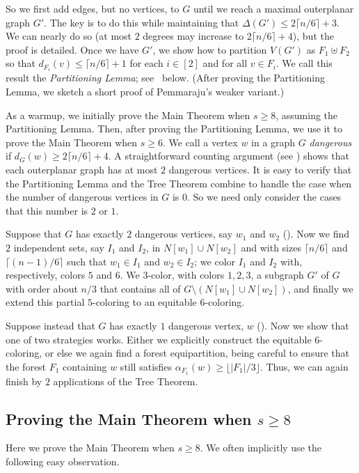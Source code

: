 \documentclass[11pt]{article}
\theoremstyle{definition}
\newcommand\floor[1]{\lfloor#1\rfloor}
\newcommand\ceil[1]{\lceil#1\rceil}
\renewcommand\ge\geqslant
\renewcommand\le\leqslant
\begin{document}
So we first add edges, but no vertices, to $G$ until we reach a maximal outerplanar graph $G'$.  The key is to do this 
while maintaining that $\Delta(G')\le 2\ceil{n/6}+3$.  We can nearly do so (at most $2$ degrees may increase to $2\ceil{n/6}+4$), but the proof is 
detailed.  Once we have $G'$, we show how to partition $V(G')$ as $F_1\uplus F_2$ so that $d_{F_i}(v)\le\ceil{n/6}+1$ for each
$i\in [2]$ and for all $v\in F_i$.  We call this result the \emph{Partitioning Lemma}; see~ below.
(After proving the Partitioning Lemma, we sketch a short proof of Pemmaraju's weaker variant.)

As a warmup, we initially prove the Main Theorem when $s\ge 8$, assuming the Partitioning Lemma.
Then, after proving the Partitioning Lemma, we use it to prove the Main Theorem when $s\ge 6$.
We call a vertex $w$ in a graph $G$ \emph{dangerous} if $d_G(w)\ge 2\ceil{n/6}+4$.  A straightforward counting argument (see )
shows that each outerplanar graph has at most $2$ dangerous vertices.  It is easy to verify that the Partitioning Lemma and the Tree Theorem combine 
to handle the case when the number of dangerous vertices in $G$ is $0$.  
So we need only consider the cases that this number is $2$ or $1$.

Suppose that $G$ has exactly $2$ dangerous vertices, say $w_1$ and $w_2$ ().
Now we find $2$ independent sets, say $I_1$ and $I_2$, in $N[w_1]\cup N[w_2]$ and with sizes $\ceil{n/6}$ and $\ceil{(n-1)/6}$ such that 
$w_1\in I_1$ and $w_2\in I_2$; we color $I_1$ and $I_2$ with, respectively, colors $5$ and $6$.  We $3$-color, with colors $1,2,3$, a subgraph $G'$ 
of $G$ with order about $n/3$ that contains all of $G\setminus(N[w_1]\cup N[w_2])$, and finally we extend this partial $5$-coloring to an equitable 
$6$-coloring.

Suppose instead that $G$ has exactly $1$ dangerous vertex, $w$ ().  Now we show that one of two strategies works.
Either we explicitly construct the equitable $6$-coloring, or else we again find a forest equipartition, being careful to ensure that
the forest $F_1$ containing $w$ still satisfies $\alpha_{F_1}(w)\ge \floor{|F_1|/3}$.  Thus, we can again finish by $2$ applications of the Tree Theorem.

\subsection{Proving the Main Theorem when \texorpdfstring{$s\ge 8$}{s >= 8}}
\label{s=8-sec}
Here we prove the Main Theorem when $s\ge 8$.  
We often implicitly use the following easy observation.
\end{document}
